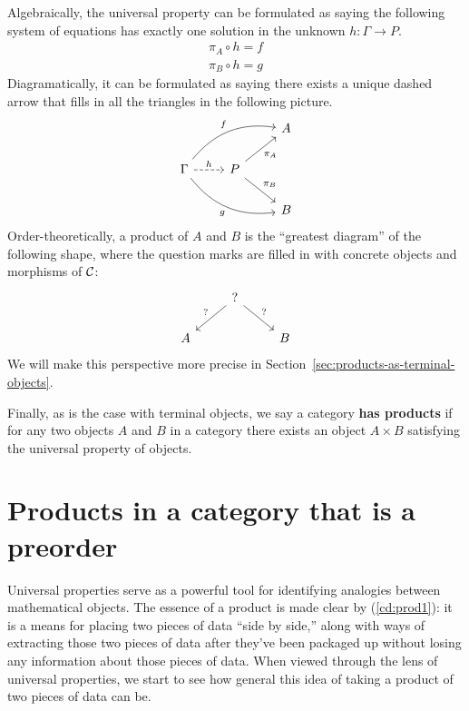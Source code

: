 Algebraically, the universal property can be formulated as saying
  the following system of equations has exactly one solution
  in the unknown \(h : \Gamma \to P\).
  \begin{align}
    \pi_A \circ h = f \\
    \pi_B \circ h = g
  \end{align}
Diagramatically, it can be formulated as saying there exists a unique
dashed arrow that fills in all the triangles in the following picture.
\begin{equation}
\begin{tikzcd}
                                                                                        &                                    & A \\
\Gamma \arrow[rru, "f", bend left] \arrow[r, "h", dashed] \arrow[rrd, "g"', bend right] & P \arrow[ru, "\pi_A"'] \arrow[rd, "\pi_B"] &   \\
                                                                                        &                                    & B
\end{tikzcd}
\end{equation}
Order-theoretically, a product of \(A\) and \(B\) is the ``greatest diagram'' of
the following shape, where the question marks are filled in with concrete objects and morphisms of \(\mathcal C\):
\[
\begin{tikzcd}
  & ? \arrow[ld, "?"'] \arrow[rd, "?"] &   \\
A &                                    & B
\end{tikzcd}
\]
We will make this perspective more precise in Section~\ref{sec:products-as-terminal-objects}.

Finally, as is the case with terminal objects, we say a category \textbf{has
products} if for any two objects $A$ and $B$ in a category there exists an 
object $A \times B$ satisfying the universal property of objects.

\section{Products in a category that is a preorder}
Universal properties serve as a powerful tool for identifying analogies between
mathematical objects. The essence of a product is made clear by
(\ref{cd:prod1}): it is a means for placing two pieces of data ``side by side,''
along with ways of extracting those two pieces of data after they've been
packaged up without losing any information about those pieces of data.  When
viewed through the lens of universal properties, we start to see how general
this idea of taking a product of two pieces of data can be.

